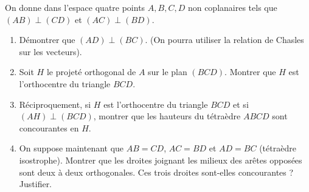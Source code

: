 \documentclass[11pt]{article}
\begin{document}
\begin{exercice}
On donne dans l'espace quatre points $A,B,C,D$ non coplanaires tels que $(AB)\perp (CD)$ et $(AC)\perp (BD)$.
\begin{enumerate}
    \item Démontrer que $(AD)\perp (BC)$. (On pourra utiliser la relation de Chasles sur les vecteurs).
    \item Soit $H$ le projeté orthogonal de $A$ sur le plan $(BCD)$. Montrer que $H$ est l'orthocentre du triangle $BCD$.
    \item Réciproquement, si $H$ est l'orthocentre du triangle $BCD$ et si $(AH)\perp (BCD)$, montrer que les hauteurs du tétraèdre $ABCD$ sont concourantes en $H$.
    \item On suppose maintenant que $AB=CD$, $AC=BD$ et $AD=BC$ (tétraèdre isostrophe). Montrer que les droites joignant les milieux des arêtes opposées sont deux à deux orthogonales. Ces trois droites sont-elles concourantes ? Justifier.
\end{enumerate}
\end{exercice}
\end{document}
